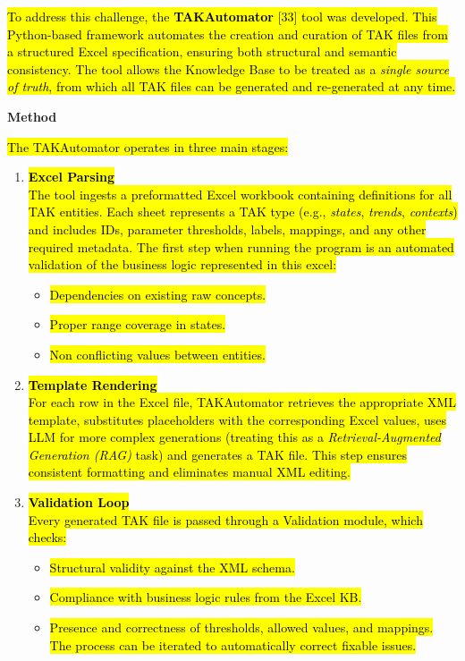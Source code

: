 \documentclass[
]{article}
\begin{document}
\hl{To address this challenge, the \textbf{TAKAutomator} {[}33{]} tool
was developed. This Python-based framework automates the creation and
curation of TAK files from a structured Excel specification, ensuring
both structural and semantic consistency. The tool allows the Knowledge
Base to be treated as a \emph{single source of truth}, from which all
TAK files can be generated and re-generated at any time.}

\textbf{Method}

\hl{The TAKAutomator operates in three main stages:}

\begin{enumerate}
\def\labelenumi{\arabic{enumi}.}
\item
  \hl{\textbf{Excel Parsing\\
  } The tool ingests a preformatted Excel workbook containing
  definitions for all TAK entities. Each sheet represents a TAK type
  (e.g., \emph{states}, \emph{trends}, \emph{contexts}) and includes
  IDs, parameter thresholds, labels, mappings, and any other required
  metadata. The first step when running the program is an automated
  validation of the business logic represented in this excel:}

  \begin{itemize}
  \item
    \hl{Dependencies on existing raw concepts.}
  \item
    \hl{Proper range coverage in states.}
  \item
    \hl{Non conflicting values between entities.}
  \end{itemize}
\item
  \hl{\textbf{Template Rendering\\
  } For each row in the Excel file, TAKAutomator retrieves the
  appropriate XML template, substitutes placeholders with the
  corresponding Excel values, uses LLM for more complex generations
  (treating this as a \emph{Retrieval-Augmented Generation (RAG)} task)
  and generates a TAK file. This step ensures consistent formatting and
  eliminates manual XML editing.}
\item
  \hl{\textbf{Validation Loop\\
  } Every generated TAK file is passed through a Validation module,
  which checks:}

  \begin{itemize}
  \item
    \hl{Structural validity against the XML schema.}
  \item
    \hl{Compliance with business logic rules from the Excel KB.}
  \item
    \hl{Presence and correctness of thresholds, allowed values, and
    mappings.\\
    The process can be iterated to automatically correct fixable
    issues.\\
    }
  \end{itemize}
\end{enumerate}
\end{document}
